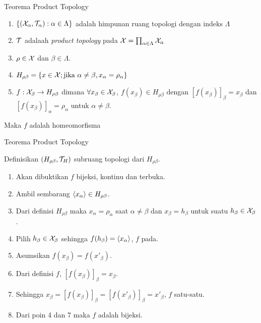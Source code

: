 \begin{frame}{Teorema Product Topology}
    \begin{tcolorbox}[enhanced,title=Teorema 2.39, frame style tile={width=\paperwidth}{\wallpaper}]
        \begin{enumerate}
            \item $\set*{\oio*{\nX_\alpha,\nT_\alpha}:\alpha \in \Lambda}$ adalah himpunan ruang topologi
        dengan indeks $\Lambda$
            \item $\nT$ adalaah \textit{product topology} pada $\nX=\prod_{\alpha \in \Lambda}\nX_\alpha$
            \item $\rho \in \nX$ dan $\beta \in \Lambda$.
            \item $H_{\rho\beta} = \set*{x \in \nX; \text{jika } \alpha \neq \beta, x_\alpha = \rho_\alpha}$
            \item $f:\nX_\beta \to H_{\rho\beta}$ dimana $\forall x_\beta \in \nX_\beta$, $f(x_\beta)\in H_{\rho\beta}$
            dengan $[f(x_\beta)]_\beta=x_\beta$ dan $[f(x_\beta)]_\alpha = \rho_\alpha$ untuk $\alpha\neq\beta$.
        \end{enumerate}
        Maka $f$ adalah homeomorfisma
    \end{tcolorbox}
\end{frame}

\begin{frame}{Teorema Product Topology}
    \begin{tcolorbox}[enhanced,title=Teorema 2.39 (Bukti), frame style tile={width=\paperwidth}{\wallpaper}]
        Definisikan $(H_{\rho\beta},\nT_H)$ subruang topologi dari $H_{\rho\beta}$.
        \begin{enumerate}
            \item Akan dibuktikan $f$ bijeksi, kontinu dan terbuka.
            \item Ambil sembarang $\seq*{x_\alpha} \in H_{\rho\beta}$. 
            \item Dari definisi $H_{\rho\beta}$ maka $x_\alpha=\rho_\alpha$ saat $\alpha\neq\beta$
            dan $x_\beta = h_\beta$ untuk suatu $h_\beta\in\nX_\beta$.
            \item Pilih $h_\beta\in\nX_\beta$ sehingga $f(h_\beta) = \seq*{x_\alpha}$, $f$ pada.
            \item Asumsikan $f(x_{\beta}) = f(x'_{\beta})$.
            \item Dari definisi $f$, $[f(x_\beta)]_\beta=x_\beta$.
            \item Sehingga $x_{\beta} = [f(x_{\beta})]_{\beta} = [f(x'_{\beta})]_{\beta} = x'_\beta$, $f$ satu-satu.
            \item Dari poin 4 dan 7 maka $f$ adalah bijeksi.
        \end{enumerate}
    \end{tcolorbox}
\end{frame}

